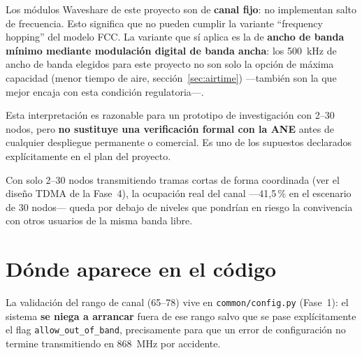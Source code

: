 Los módulos Waveshare de este proyecto son de \textbf{canal fijo}: no implementan salto de
frecuencia. Esto significa que no pueden cumplir la variante ``frequency hopping'' del modelo
FCC. La variante que sí aplica es la de \textbf{ancho de banda mínimo mediante modulación
digital de banda ancha}: los \SI{500}{kHz} de ancho de banda elegidos para este proyecto no son
solo la opción de máxima capacidad (menor tiempo de aire, sección~\ref{sec:airtime}) —también
son la que mejor encaja con esta condición regulatoria—.

\begin{nota}
Esta interpretación es razonable para un prototipo de investigación con 2--30 nodos, pero
\textbf{no sustituye una verificación formal con la ANE} antes de cualquier despliegue
permanente o comercial. Es uno de los supuestos declarados explícitamente en el plan del
proyecto.
\end{nota}

Con solo 2--30 nodos transmitiendo tramas cortas de forma coordinada (ver el diseño TDMA de la
Fase~4), la ocupación real del canal —41,5\,\% en el escenario de 30 nodos— queda por debajo de
niveles que pondrían en riesgo la convivencia con otros usuarios de la misma banda libre.

\section{Dónde aparece en el código}

La validación del rango de canal (65--78) vive en \texttt{common/config.py} (Fase~1): el
sistema \textbf{se niega a arrancar} fuera de ese rango salvo que se pase explícitamente el
flag \texttt{allow\_out\_of\_band}, precisamente para que un error de configuración no termine
transmitiendo en \SI{868}{MHz} por accidente.
